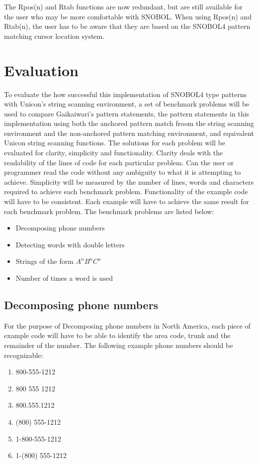 \documentclass{article}
\begin{document}
The Rpos(n) and Rtab functions are now redundant, but are still available for the user who may be more comfortable with SNOBOL.  When using Rpos(n) and Rtab(n), the user has to be aware that they are based on the SNOBOL4 pattern matching cursor location system.

\section{Evaluation}
To evaluate the how successful this implementation of SNOBOL4 type patterns with Unicon's string scanning environment, a set of benchmark problems will be used to compare Gaikaiwari's pattern statements, the pattern statements in this implementation using both the anchored pattern match froom the string scanning environment and the non-anchored pattern matching environment, and equivalent Unicon string scanning functions.  The solutions for each problem will be evaluated for clarity, simplicity and functionality.  Clarity deals with the readability of the lines of code for each particular problem.  Can the user or programmer read the code without any ambiguity to what it is attempting to achieve.  Simplicity will be measured by the number of lines, words and characters required to achieve each benchmark problem.  Functionality of the example code will have to be consistent.  Each example will have to achieve the same result for each benchmark problem.  The benchmark problems are listed below:

\begin{itemize}
\item Decomposing phone numbers
\item Detecting words with double letters
\item Strings of the form \emph{$A^nB^nC^n$}
\item Number of times a word is used
\end{itemize}

\subsection{Decomposing phone numbers}
For the purpose of Decomposing phone numbers in North America, each piece of example code will have to be able to identify the area code, trunk and the remainder of the number.  The following example phone numbers should be recognizable:

\begin{enumerate}
\item 800-555-1212
\item 800 555 1212
\item 800.555.1212
\item (800) 555-1212
\item 1-800-555-1212
\item 1-(800) 555-1212
\end{enumerate}
\end{document}

